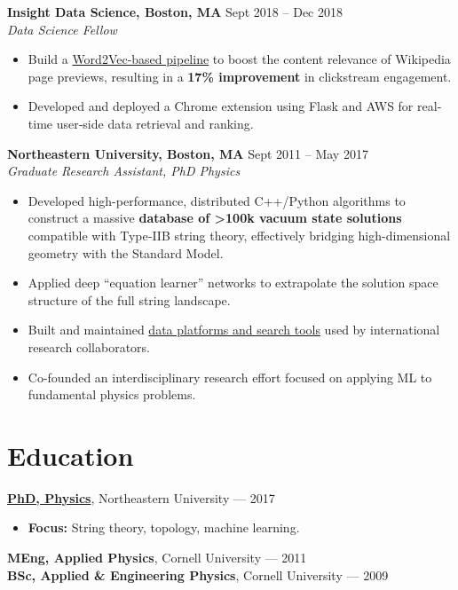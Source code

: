 \documentclass[10pt,a4paper]{article}
\begin{document}

\vspace{6pt}

\textbf{Insight Data Science, Boston, MA} \hfill Sept 2018 – Dec 2018 \\
\textit{Data Science Fellow}
\begin{itemize}
    \fontsize{9}{11}\selectfont
    \item Build a \href{https://github.com/knowbodynos/wikontext}{Word2Vec-based pipeline} to boost the content relevance of Wikipedia page previews, resulting in a \textbf{17\% improvement} in clickstream engagement.
    \item Developed and deployed a Chrome extension using Flask and AWS for real‐time user‐side data retrieval and ranking.
\end{itemize}

\vspace{6pt}

\textbf{Northeastern University, Boston, MA} \hfill Sept 2011 – May 2017 \\
\textit{Graduate Research Assistant, PhD Physics}
\begin{itemize}
    \fontsize{9}{11}\selectfont
    \item Developed high-performance, distributed C++/Python algorithms to construct a massive \textbf{database of >100k vacuum state solutions} compatible with Type‐IIB string theory, effectively bridging high-dimensional geometry with the Standard Model.
    \item Applied deep “equation learner” networks to extrapolate the solution space structure of the full string landscape.
    \item Built and maintained \href{http://www.rossealtman.com/toriccy/}{data platforms and search tools} used by international research collaborators.
    \item Co-founded an interdisciplinary research effort focused on applying ML to fundamental physics problems.
\end{itemize}

\section*{Education \hrulefill}
\textbf{\href{https://www.proquest.com/openview/880c7ee0f4555e0ad65107724bae7a11/1?pq-origsite=gscholar&cbl=18750}{PhD, Physics}}, Northeastern University — 2017
\begin{itemize}
    \fontsize{9}{11}\selectfont
    \item {\textbf{Focus:} String theory, topology, machine learning.}
\end{itemize}
\vspace{4pt}
\textbf{MEng, Applied Physics}, Cornell University — 2011 \\
\vspace{4pt}
\textbf{BSc, Applied \& Engineering Physics}, Cornell University — 2009
\end{document}

